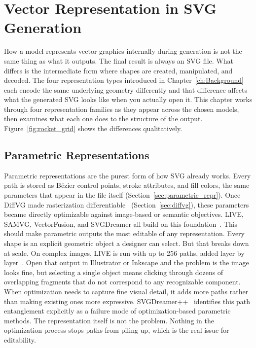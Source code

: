\chapter{Vector Representation in SVG Generation}
\label{ch:representation}

How a model represents vector graphics internally during generation is not the same thing as what it outputs. 
The final result is always an SVG file. What differs is the intermediate form where shapes are created,
manipulated, and decoded. The four representation types introduced in Chapter~\ref{ch:Background} each encode the same underlying
geometry differently and that difference affects what the generated SVG looks like when you actually open it.
This chapter works through four representation families as they appear across the chosen models, 
then examines what each one does to the structure of the output. 
Figure~\ref{fig:rocket_grid} shows the differences qualitatively.

\section{Parametric Representations}
\label{sec:parametric}

Parametric representations are the purest form of how SVG already works. Every path is stored as B\'{e}zier control points, 
stroke attributes, and fill colors, the same parameters that appear in the file itself (Section~\ref{sec:parametric_repr}). 
Once DiffVG made rasterization differentiable~\cite{liDifferentiableVectorGraphics2020a} (Section~\ref{sec:diffvg}), 
these parameters became directly optimizable against image-based or semantic objectives. LIVE, SAMVG, VectorFusion, 
and SVGDreamer all build on this foundation~\cite{maLayerwiseImageVectorization2022, zhuSAMVGMultistageImage2023, 
jainVectorFusionTexttoSVGAbstracting2022, xingSVGDreamerTextGuided2024}.
This should make parametric outputs the most editable of any representation. Every shape is an explicit geometric object a designer can select. 
But that breaks down at scale. On complex images, LIVE is run with up to 256 paths, added layer by layer~\cite{maLayerwiseImageVectorization2022}. 
Open that output in Illustrator or Inkscape and the problem is the image looks fine, 
but selecting a single object means clicking through dozens of overlapping fragments that do not correspond to any recognizable component. 
When optimization needs to capture fine visual detail, it adds more paths rather than making existing ones more expressive. 
SVGDreamer++~\cite{xingSVGDreamerAdvancingEditability2025} identifies this path entanglement explicitly as a failure mode of optimization-based parametric methods.
The representation itself is not the problem. Nothing in the optimization process stops paths from piling up, which is the real issue for editability.

